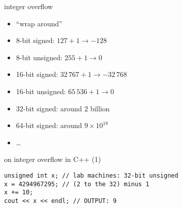 \begin{comment}
\begin{frame}{two's complement exercise}
\begin{itemize}
\item -45 as 8-bit two's complement?
    \begin{itemize}
    \item<2->
        $-45 \rightarrow -00101101_\text{TWO} \rightarrow 11010010 + 1 \rightarrow 11010011$
    \end{itemize}
\item -128 as 8-bit two's complement?
    \begin{itemize}
    \item<2->
        $-128 \rightarrow -10000000_\text{TWO} \rightarrow 01111111 + 1 \rightarrow 10000000$
    \end{itemize}
\item -129 as 8-bit two's complement?
    \begin{itemize}
    \item<2->
        $-129 \rightarrow -10000001_\text{TWO} \rightarrow 01111110 + 1 \rightarrow 01111111$
    \item<2-> \myemph{OVERFLOW} --- result not negative
    \end{itemize}
\end{itemize}
\end{frame}
\end{comment}


\begin{frame}{integer overflow}
    \begin{itemize}
    \item ``wrap around''
    \item 8-bit signed: $127 + 1 \rightarrow -128$
    \item 8-bit unsigned: $255 + 1 \rightarrow 0$ 
    \item 16-bit signed: $32\,767 + 1 \rightarrow -32\,768$
    \item 16-bit unsigned: $65\,536 + 1 \rightarrow 0$ 
    \item 32-bit signed: around $2$ billion
    \item 64-bit signed: around $9\times 10^{18}$
    \item \ldots
    \end{itemize}
\end{frame}


\begin{frame}[fragile,label=cppIO1]{on integer overflow in C++ (1)}
\lstset{language=C++,style=small}
\begin{lstlisting}
unsigned int x; // lab machines: 32-bit unsigned
x = 4294967295; // (2 to the 32) minus 1
x += 10;
cout << x << endl; // OUTPUT: 9
\end{lstlisting}
\end{frame}


